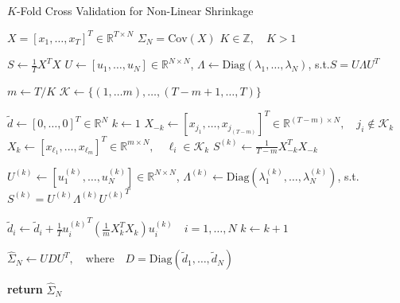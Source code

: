 \documentclass{article}
\begin{document}
\begin{algorithm}
	\caption{$K$-Fold Cross Validation for Non-Linear Shrinkage}
	\label{alg:nls_kcv}
	\begin{algorithmic}[1]
	\Require $X = [x_1, \ldots, x_T]^T \in \mathbb{R}^{T\times N}$
	\Require $\Sigma_N = \mathrm{Cov}(X)$
	\Require $K \in \mathbb{Z}, \quad K > 1$

		\State $S \gets \frac1T X^T X$
		\State 
				$U \gets [u_1, \ldots, u_N] \in \mathbb{R}^{N\times N}$,
				\quad $\Lambda \gets \mathrm{Diag}(\lambda_1, \ldots, \lambda_N)$,
				\quad \mbox{s.t.}\quad $S = U \Lambda {U}^T$

		\State $m \gets T / K$
		\State $\mathcal{K} \gets \{(1, \ldots m), \ldots, (T-m+1, \ldots, T)\}$

		\State $\tilde{d} \gets [0, \ldots, 0]^T \in \mathbb{R}^{N}$
		\State $k \gets 1$
			\State $X_{-k} \gets [x_{j_1}, \ldots, x_{j_{(T-m)}}]^T \in \mathbb{R}^{(T-m)\times N}, 
				\quad j_i \notin \mathcal{K}_k$
			\State $X_{k} \gets [x_{\ell_1}, \ldots, x_{\ell_m}]^T \in \mathbb{R}^{m\times N}, 
				\quad \ell_i \in \mathcal{K}_k$
			\State $S^{(k)} \gets \frac{1}{T-m} X_{-k}^T X_{-k} $

			\State 
				$U^{(k)} \gets [u^{(k)}_1, \ldots, u^{(k)}_N] \in \mathbb{R}^{N\times N}$,
				\quad $\Lambda^{(k)} 
					\gets \mathrm{Diag}(\lambda^{(k)}_1, \ldots, \lambda^{(k)}_N)$,
				\quad \mbox{s.t.}\quad $S^{(k)} = U^{(k)} \Lambda^{(k)} {U^{(k)}}^T$


			\State $\tilde{d}_i \gets \tilde{d}_i 
				+ \frac1T {u^{(k)}_i}^T (\frac1m X_{k}^T X_{k}) u^{(k)}_i 
				\quad i = 1, \ldots, N$
			\State $k \gets k+1$
		\EndWhile

		\State $\hat{\Sigma}_N \gets UDU^T, \quad 
			\mbox{where}\quad D = \mathrm{Diag}(\tilde{d}_1, \ldots, \tilde{d}_N)$

		\State \textbf{return} $\hat{\Sigma}_N$ 
	\EndProcedure
	\end{algorithmic}
\end{algorithm}
\end{document}
